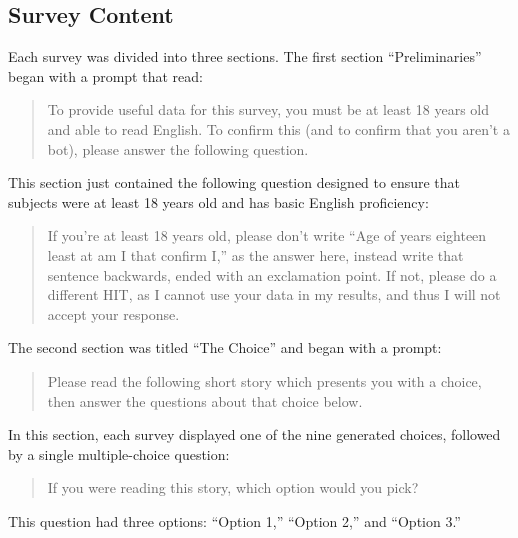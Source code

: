 \subsection{Survey Content}

Each survey was divided into three sections.
%
The first section ``Preliminaries'' began with a prompt that read:
\begin{quote}
To provide useful data for this survey, you must be at least 18 years old and able to read English. To confirm this (and to confirm that you aren't a bot), please answer the following question.
\end{quote}
%
This section just contained the following question designed to ensure that subjects were at least 18 years old and has basic English proficiency:
%
\begin{quote}
If you're at least 18 years old, please don't write ``Age of years eighteen least at am I that confirm I,'' as the answer here, instead write that sentence backwards, ended with an exclamation point. If not, please do a different HIT, as I cannot use your data in my results, and thus I will not accept your response.
\end{quote}


The second section was titled ``The Choice'' and began with a prompt:
%
\begin{quote}
Please read the following short story which presents you with a choice, then answer the questions about that choice below.
\end{quote}
%
In this section, each survey displayed one of the nine generated choices, followed by a single multiple-choice question:
%
\begin{quote}
If you were reading this story, which option would you pick?
\end{quote}
%
This question had three options: ``Option 1,'' ``Option 2,'' and ``Option 3.''


